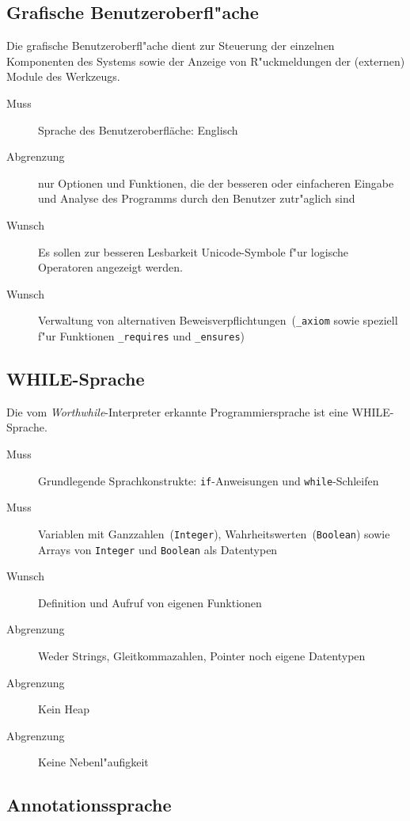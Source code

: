 \subsection{Grafische Benutzeroberfl"ache}%

Die grafische Benutzeroberfl"ache dient zur Steuerung der einzelnen Komponenten des Systems sowie der Anzeige von R"uckmeldungen der (externen) \see Module des Werkzeugs.%

\begin{description}%
    \item [Muss] Sprache des Benutzeroberfläche: Englisch%
    \item [Abgrenzung] nur Optionen und Funktionen, die der besseren oder einfacheren Eingabe und Analyse des Programms durch den Benutzer zutr"aglich sind%
    \item [Wunsch] Es sollen zur besseren Lesbarkeit \see Unicode-Symbole f"ur \see logische Operatoren angezeigt werden.%
    \item [Wunsch] Verwaltung von alternativen \see Beweisverpflichtungen~(\texttt{\_axiom} sowie speziell f"ur Funktionen \texttt{\_requires} und \texttt{\_ensures})%
\end{description}%

\subsection{WHILE-Sprache}%

Die vom \textit{Worthwhile}-Interpreter erkannte Programmiersprache ist eine \see WHILE-Sprache.%

\begin{description}%
    \item [Muss] Grundlegende Sprachkonstrukte: \texttt{if}-Anweisungen und \texttt{while}-Schleifen%
    \item [Muss] Variablen mit Ganzzahlen~(\texttt{Integer}), Wahrheitswerten~(\texttt{Boolean}) sowie Arrays von \texttt{Integer} und \texttt{Boolean} als Datentypen%
    \item [Wunsch] Definition und Aufruf von eigenen Funktionen%
    \item [Abgrenzung] Weder Strings, Gleitkommazahlen, Pointer noch eigene Datentypen%
    \item [Abgrenzung] Kein \see Heap%
    \item [Abgrenzung] Keine \see Nebenl"aufigkeit%
\end{description}%

\subsection{Annotationssprache}%


